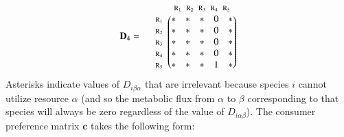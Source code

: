 \documentclass[a4paper,10pt]{article}
\begin{document}
\begin{equation*}
\mathbf{D}_4 = \; \; \; \; \; \begin{matrix}
 & 

\begin{matrix}
\text{\scriptsize $\mathrm{R}_1$} \!\!\! & 
\text{\scriptsize $\mathrm{R}_2$} \!\!\! & 
\text{\scriptsize $\mathrm{R}_3$} \!\!\! & 
\text{\scriptsize $\mathrm{R}_4$} \!\!\! & 
\text{\scriptsize $\mathrm{R}_5$}
\end{matrix}

\\ 

\begin{matrix*}[l]
\text{\scriptsize $\mathrm{R}_1$} \!\!\! \\
\text{\scriptsize $\mathrm{R}_2$} \!\!\! \\
\text{\scriptsize $\mathrm{R}_3$} \!\!\! \\
\text{\scriptsize $\mathrm{R}_4$} \!\!\! \\
\text{\scriptsize $\mathrm{R}_5$} \!\!\!
\end{matrix*}

& 

\begin{pmatrix}
* & * & * & 0 & * \\
* & * & * & 0 & * \\
* & * & * & 0 & * \\
* & * & * & 0 & * \\
* & * & * & 1 & *
\end{pmatrix}

\end{matrix}
\end{equation*}
%
Asterisks indicate values of $D_{i\beta\alpha}$ that are irrelevant because
species $i$ cannot utilize resource $\alpha$ (and so the metabolic flux from
$\alpha$ to $\beta$ corresponding to that species will always be zero
regardless of the value of $D_{i\alpha\beta}$).
The consumer preference matrix $\mathbf{c}$ takes the following form:
\end{document}
